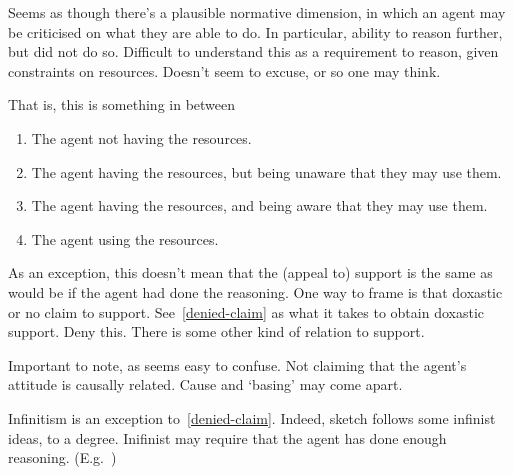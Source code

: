 \begin{note}
  Seems as though there's a plausible normative dimension, in which an agent may be criticised on what they are able to do.
  In particular, ability to reason further, but did not do so.
  Difficult to understand this as a requirement to reason, given constraints on resources.
  Doesn't seem to excuse, or so one may think.

  That is, this is something in between
  \begin{enumerate}
  \item The agent not having the resources.
  \item The agent having the resources, but being unaware that they may use them.
  \item The agent having the resources, and being aware that they may use them.
  \item The agent using the resources.
  \end{enumerate}
\end{note}

\begin{note}
  As an exception, this doesn't mean that the (appeal to) support is the same as would be if the agent had done the reasoning.
  One way to frame is that doxastic or no claim to support.
  See~\ref{denied-claim} as what it takes to obtain doxastic support.
  Deny this.
  There is some other kind of relation to support.
\end{note}

{
  \begin{note}[No causality]
    Important to note, as seems easy to confuse.
    Not claiming that the agent's attitude is causally related.
    Cause and `basing' may come apart.
  \end{note}

  \begin{note}
    Infinitism is an exception to~\ref{denied-claim}.
    Indeed, sketch follows some infinist ideas, to a degree.
    Inifinist may require that the agent has done enough reasoning.
    (E.g.\ \textcite[10]{Klein:2007ve})
  \end{note}
}

